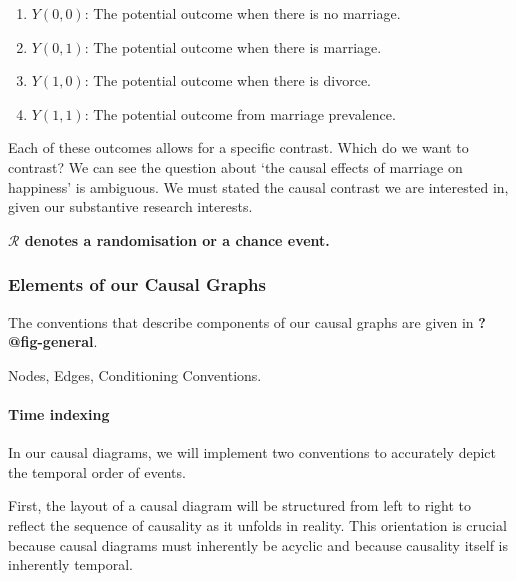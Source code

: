 \documentclass[
  single column]{article}
\let\oldparagraph\paragraph
\renewcommand{\paragraph}[1]{\oldparagraph{#1}\mbox{}}
\providecommand{\tightlist}{%
  \setlength{\itemsep}{0pt}\setlength{\parskip}{0pt}}\usepackage{longtable,booktabs,array}
\begin{document}
\begin{enumerate}
\def\labelenumi{\arabic{enumi}.}
\tightlist
\item
  \(Y(0, 0)\): The potential outcome when there is no marriage.
\item
  \(Y(0, 1)\): The potential outcome when there is marriage.
\item
  \(Y(1, 0)\): The potential outcome when there is divorce.
\item
  \(Y(1, 1)\): The potential outcome from marriage prevalence.
\end{enumerate}

Each of these outcomes allows for a specific contrast. Which do we want
to contrast? We can see the question about `the causal effects of
marriage on happiness' is ambiguous. We must stated the causal contrast
we are interested in, given our substantive research interests.

\textbf{\(\mathcal{R}\) denotes a randomisation or a chance event.}

\subsubsection{Elements of our Causal
Graphs}\label{elements-of-our-causal-graphs}

The conventions that describe components of our causal graphs are given
in \textbf{?@fig-general}.

\begin{table}

\caption{\label{tbl-general}Nodes, Edges, Conditioning Conventions.}

\centering{

\terminologygeneral

}

\end{table}%

\paragraph{Time indexing}\label{time-indexing}

In our causal diagrams, we will implement two conventions to accurately
depict the temporal order of events.

First, the layout of a causal diagram will be structured from left to
right to reflect the sequence of causality as it unfolds in reality.
This orientation is crucial because causal diagrams must inherently be
acyclic and because causality itself is inherently temporal.
\end{document}
